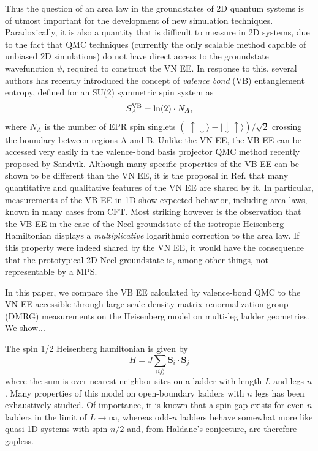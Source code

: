 \documentclass[prl,aps,twocolumn,floatfix,amsmath,amssymb,superscriptaddress,tightenlines]{revtex4}
\begin{document}

Thus the question of an area law in the groundstates of 2D quantum systems is of utmost important for the development of new simulation techniques.  Paradoxically, it is also a quantity that is difficult to measure in 2D systems, due to the fact that QMC techniques (currently the only scalable method capable of unbiased 2D simulations) do not have direct access to the groundstate wavefunction $\psi$, required to construct the VN EE.  In response to this, several authors \cite{Alet} has recently introduced the concept of {\it valence bond} (VB) entanglement entropy, defined for an SU(2) symmetric spin system as
\begin{equation}
S^{\rm VB}_A = \ln(2) \cdot N_A,
\end{equation}
where $N_A$ is the number of EPR spin singlets ${( |\uparrow \downarrow \rangle - | \downarrow \uparrow \rangle)/\sqrt{2}}$ crossing the boundary between regions A and B.  Unlike the VN EE, the VB EE can be accessed very easily in the valence-bond basis projector QMC method recently proposed by Sandvik.  Although many specific properties of the VB EE can be shown to be different than the VN EE, it is the proposal in Ref. that many quantitative and qualitative features of the VN EE are shared by it.   In particular, measurements of the VB EE in 1D show expected behavior, including area laws,  known in many cases from CFT.  Most striking however is the observation that the VB EE in the case of the Neel groundstate of the isotropic Heisenberg Hamiltonian displays a {\it multiplicative} logarithmic correction to the area law.  If this property were indeed shared by the VN EE, it would have the consequence that the prototypical 2D Neel groundstate is, among other things, not representable by a MPS.

In this paper, we compare the VB EE calculated by valence-bond QMC to the VN EE accessible through large-scale density-matrix renormalization group (DMRG) measurements on the Heisenberg model on multi-leg ladder geometries.    We show...

The spin 1/2 Heisenberg hamiltonian is given by
\begin{equation}
H = J \sum_{\langle i j \rangle} {\mathbf S}_i \cdot {\mathbf S}_j \label{ham}
\end{equation}
where the sum is over nearest-neighbor sites on a ladder with length $L$ and legs $n$.  Many properties of this model on open-boundary ladders with $n$ legs has been exhaustively studied.  Of importance, it is known that a spin gap exists for even-$n$ ladders in the limit of $L\rightarrow \infty$, whereas odd-$n$ ladders behave somewhat more like quasi-1D  systems with spin $n/2$ and, from Haldane's conjecture, are therefore gapless.  
\end{document}
